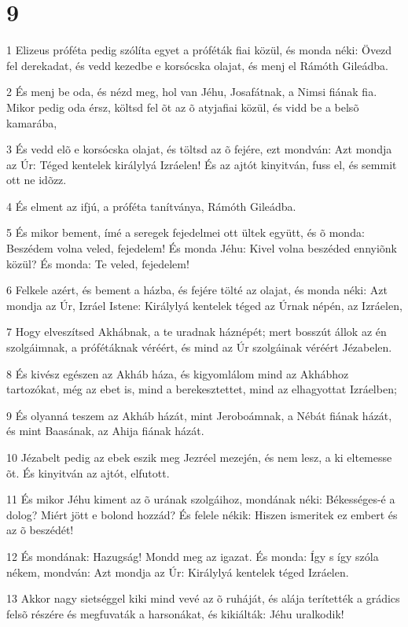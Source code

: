 \chapter{9}

\par 1 Elizeus próféta pedig szólíta egyet a próféták fiai közül, és monda néki: Övezd fel derekadat, és vedd kezedbe e korsócska olajat, és menj el Rámóth Gileádba.
\par 2 És menj be oda, és nézd meg, hol van Jéhu, Josafátnak, a Nimsi fiának fia. Mikor pedig oda érsz, költsd fel õt az õ atyjafiai közül, és vidd be a belsõ kamarába,
\par 3 És vedd elõ e korsócska olajat, és töltsd az õ fejére, ezt mondván: Azt mondja az Úr: Téged kentelek királylyá Izráelen! És az ajtót kinyitván, fuss el, és  semmit ott ne idõzz.
\par 4 És elment az ifjú, a próféta tanítványa, Rámóth Gileádba.
\par 5 És mikor bement, ímé a seregek fejedelmei ott ültek együtt, és õ monda: Beszédem volna veled, fejedelem! És monda Jéhu: Kivel volna beszéded ennyiõnk közül? És monda: Te veled, fejedelem!
\par 6 Felkele azért, és bement a házba, és fejére tölté az olajat, és monda néki: Azt mondja az Úr, Izráel Istene: Királylyá kentelek téged az Úrnak népén, az Izráelen,
\par 7 Hogy elveszítsed Akhábnak, a te uradnak háznépét; mert bosszút állok az én szolgáimnak, a  prófétáknak véréért, és mind az Úr szolgáinak véréért Jézabelen.
\par 8 És kivész egészen az Akháb háza, és kigyomlálom mind az Akhábhoz tartozókat, még az ebet is, mind a berekesztettet, mind az elhagyottat Izráelben;
\par 9 És olyanná teszem az Akháb házát, mint Jeroboámnak, a Nébát fiának házát, és mint Baasának, az Ahija fiának házát.
\par 10 Jézabelt pedig az ebek eszik meg Jezréel mezején, és nem lesz, a ki eltemesse õt. És kinyitván az ajtót, elfutott.
\par 11 És mikor Jéhu kiment az õ urának szolgáihoz, mondának néki: Békességes-é a dolog? Miért jött e bolond hozzád? És felele nékik: Hiszen ismeritek ez embert és az õ beszédét!
\par 12 És mondának: Hazugság! Mondd meg az igazat. És monda: Így s így szóla nékem, mondván: Azt mondja az Úr: Királylyá kentelek téged Izráelen.
\par 13 Akkor nagy sietséggel kiki mind vevé az õ ruháját, és alája terítették a grádics felsõ részére és megfuvaták a harsonákat, és kikiálták: Jéhu uralkodik!
